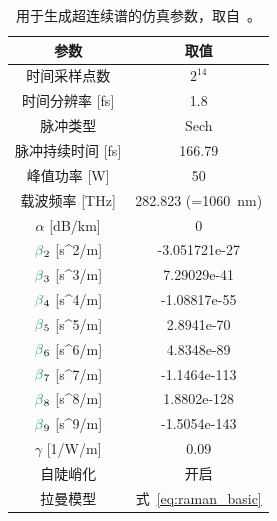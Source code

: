 \begin{table}[]
\centering
\begin{tabular}{cc}
\textbf{参数}                      & \textbf{取值}                                  \\ \hline
时间采样点数                           & $2^{14}$                                          \\
时间分辨率 {[}fs{]}                & 1.8                                             \\\hline
脉冲类型                              & Sech                                            \\
脉冲持续时间 {[}fs{]}                       & 166.79                                          \\
峰值功率 {[}W{]}                      & 50                                              \\
载波频率 {[}THz{]}                 & 282.823 (=1060~nm)                         \\\hline
$\alpha$ {[}dB/km{]}                    & 0                                               \\
$\betag_2$ {[}s\textasciicircum{}2/m{]} & -3.051721e-27                                   \\
$\betag_3$ {[}s\textasciicircum{}3/m{]} & 7.29029e-41                                     \\
$\betag_4$ {[}s\textasciicircum{}4/m{]} & -1.08817e-55                                    \\
$\betag_5$ {[}s\textasciicircum{}5/m{]} & 2.8941e-70                                      \\
$\betag_6$ {[}s\textasciicircum{}6/m{]} & 4.8348e-89                                      \\
$\betag_7$ {[}s\textasciicircum{}7/m{]} & -1.1464e-113                                    \\
$\betag_8$ {[}s\textasciicircum{}8/m{]} & 1.8802e-128                                     \\
$\betag_9$ {[}s\textasciicircum{}9/m{]} & -1.5054e-143                                    \\
$\gamma$ {[}1/W/m{]}                    & 0.09                                            \\
自陡峭化                         & 开启                                              \\
拉曼模型                             & 式~\ref{eq:raman_basic}
\end{tabular}
\caption{用于生成超连续谱的仿真参数，取自~\cite{supercontinuum_paper}。}
\label{tab:SC_params}
\end{table}


